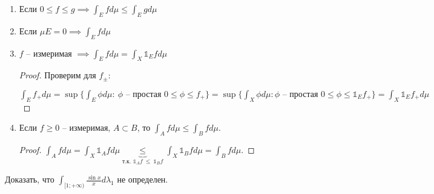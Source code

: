 \begin{properties}
    \begin{enumerate}
        \item Если $0 \leq f \leq g \implies \int_E f d \mu \leq \int_E g d \mu$
        \item Если $\mu E = 0 \implies \int_E f d \mu$
        \item {
            $f$ -- измеримая $\implies \int_E f d \mu = \int_X \mathbb{1}_E f d \mu$ 

            \begin{proof}
                Проверим для $f_{\pm}$:
                
                $\int_E f_+ d \mu = \sup \{  \int_E \phi d \mu: \ \phi \text{ -- простая } 0 \leq \phi \leq f_+ \} = \sup \{ \int_X \phi d \mu: \phi \text{ -- простая } 0 \leq \phi \leq \mathbb{1}_E f_+ \} = \int_X \mathbb{1}_E f_+ d \mu$ 
            \end{proof}
        }
        \item {
            Если $f \geq 0$ -- измеримая, $A \subset B$, то $\int_A f d \mu \leq \int_B f d \mu$.

            \begin{proof}
                $\int_A f d \mu = \int_X \mathbb{1}_A f d \mu \underbrace{\leq}_{\text{т.к. } \mathbb{1}_A f \ \leq \ \mathbb{1}_B f} \int_X \mathbb{1}_B f d \mu = \int_B f d \mu$.
            \end{proof}
        }
    \end{enumerate}
\end{properties}

\begin{exerc}
    Доказать, что $\int_{[1; +\infty)}{\frac{\sin{x}}{x} d \lambda_1}$ не определен.
\end{exerc}


